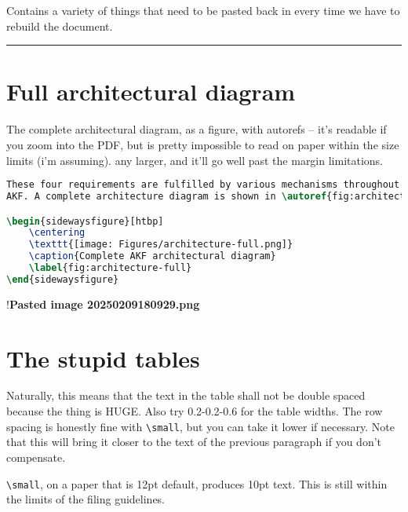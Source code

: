 Contains a variety of things that need to be pasted back in every time
we have to rebuild the document.

\begin{center}\rule{0.5\linewidth}{0.5pt}\end{center}

\section{Full architectural diagram}\label{full-architectural-diagram}

The complete architectural diagram, as a figure, with autorefs -- it's
readable if you zoom into the PDF, but is pretty impossible to read on
paper within the size limits (i'm assuming). any larger, and it'll go
well past the margin limitations.

\begin{lstlisting}[language=TeX]
These four requirements are fulfilled by various mechanisms throughout
AKF. A complete architecture diagram is shown in \autoref{fig:architecture-full}. 

\begin{sidewaysfigure}[htbp]
    \centering
    \texttt{[image: Figures/architecture-full.png]}
    \caption{Complete AKF architectural diagram}
    \label{fig:architecture-full}
\end{sidewaysfigure}   
\end{lstlisting}

!\textbf{Pasted image 20250209180929.png}

\section{The stupid tables}\label{the-stupid-tables}

Naturally, this means that the text in the table shall not be double
spaced because the thing is HUGE. Also try 0.2-0.2-0.6 for the table
widths. The row spacing is honestly fine with
\passthrough{\lstinline!\\small!}, but you can take it lower if
necessary. Note that this will bring it closer to the text of the
previous paragraph if you don't compensate.

\passthrough{\lstinline!\\small!}, on a paper that is 12pt default,
produces 10pt text. This is still within the limits of the filing
guidelines.

